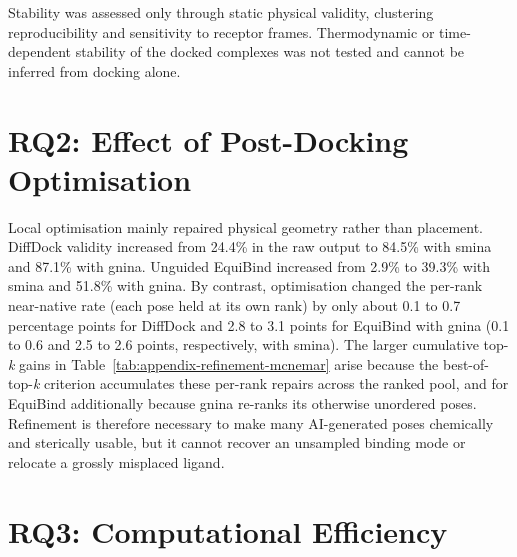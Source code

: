 Stability was assessed only through static physical validity, clustering reproducibility and sensitivity to receptor frames. Thermodynamic or time-dependent stability of the docked complexes was not tested and cannot be inferred from docking alone.

\hypertarget{rq2-effect-of-post-docking-optimisation}{%
\section{RQ2: Effect of Post-Docking Optimisation}\label{rq2-effect-of-post-docking-optimisation}}

Local optimisation mainly repaired physical geometry rather than placement. DiffDock validity increased from 24.4\% in the raw output to 84.5\% with smina and 87.1\% with gnina. Unguided EquiBind increased from 2.9\% to 39.3\% with smina and 51.8\% with gnina. By contrast, optimisation changed the per-rank near-native rate (each pose held at its own rank) by only about 0.1 to 0.7 percentage points for DiffDock and 2.8 to 3.1 points for EquiBind with gnina (0.1 to 0.6 and 2.5 to 2.6 points, respectively, with smina). The larger cumulative top-\emph{k} gains in Table~\ref{tab:appendix-refinement-mcnemar} arise because the best-of-top-\emph{k} criterion accumulates these per-rank repairs across the ranked pool, and for EquiBind additionally because gnina re-ranks its otherwise unordered poses. Refinement is therefore necessary to make many AI-generated poses chemically and sterically usable, but it cannot recover an unsampled binding mode or relocate a grossly misplaced ligand.

\hypertarget{rq3-computational-efficiency}{%
\section{RQ3: Computational Efficiency}\label{rq3-computational-efficiency}}

